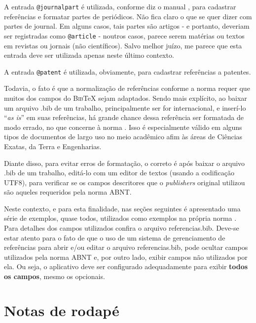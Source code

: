 \begin{apendicesenv}
    A entrada \verb|@journalpart| é utilizada, conforme diz o manual \cite{abnTeX22014d}, para cadastrar referências e formatar partes de periódicos.
    Não fica claro o que se quer dizer com partes de journal.
    Em alguns casos, tais partes são artigos - e portanto, deveriam ser registradas como \verb|@article| - noutros casos, parece serem matérias ou textos em revistas ou jornais (não científicos).
    Salvo melhor juízo, me parece que esta entrada deve ser utilizada apenas neste último contexto.

    A entrada \verb|@patent| é utilizada, obviamente, para cadastrar referências a patentes.

    Todavia, o fato é que a normalização de referências conforme a norma  requer que muitos dos campos do \textsc{Bib}\TeX{} sejam adaptados.
    Sendo mais explícito, ao baixar um arquivo {\color{red} .bib} de um trabalho, principalmente ser for internacional, e inserí-lo ``\textit{as is}'' em suas referências, há grande chance dessa referência ser formatada de modo errado, no que concerne à norma .
    Isso é especialmente válido em alguns tipos de documentos de largo uso no meio acadêmico afim às áreas de Ciências Exatas, da Terra e Engenharias.

    Diante disso, para evitar erros de formatação, o correto é após baixar o arquivo {\color{red} .bib} de um trabalho, editá-lo com um editor de textos (usando a codificação UTF8), para verificar se os campos descritores que o \textit{publishers} original utilizou são aqueles requeridos pela norma ABNT.

    Neste contexto, e para esta finalidade, nas seções seguintes é apresentado uma série de exemplos, quase todos, utilizados como exemplos na própria norma .
    Para detalhes dos campos utilizados confira o arquivo {\color{red} referencias.bib}.
    Deve-se estar atento para o fato de que o uso de um sistema de gerenciamento de referências para abrir e/ou editar o arquivo {\color{red} referencias.bib}, pode ocultar campos utilizados pela norma ABNT e, por outro lado, exibir campos não utilizados por ela.
    Ou seja, o aplicativo deve ser configurado adequadamente para exibir \textbf{todos os campos}, mesmo os opcionais.

    \section{Notas de rodapé}
    \label{sec_notas_de_rodape}


\end{apendicesenv}
